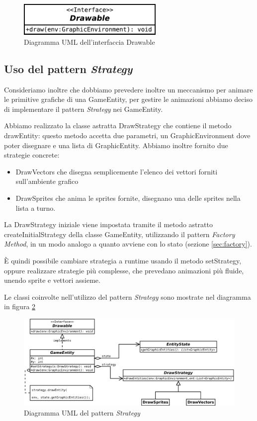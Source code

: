 \documentclass[a4paper,12pt]{article}
\begin{document}
\begin{figure}[ht]
\centering
\includegraphics[width=7cm]{Drawable.pdf}
\caption{Diagramma UML dell'interfaccia \textsf{Drawable}}
\label{img:Drawable}
\end{figure}

\subsection{Uso del pattern \emph{Strategy}}

Consideriamo inoltre che dobbiamo prevedere inoltre un meccanismo per animare le primitive grafiche di una \textsf{GameEntity}, per gestire le animazioni abbiamo deciso di implementare il pattern \emph{Strategy} nei \textsf{GameEntity}.

Abbiamo realizzato la classe astratta \textsf{DrawStrategy} che contiene il metodo \textsf{drawEntity}: questo metodo accetta due parametri, un \textsf{GraphicEnvironment} dove poter disegnare e una lista di \textsf{GraphicEntity}. Abbiamo inoltre fornito due strategie concrete:

\begin{itemize}
\item \textsf{DrawVectors} che disegna semplicemente l'elenco dei vettori forniti sull'ambiente grafico
\item \textsf{DrawSprites} che anima le sprites fornite, disegnano una delle sprites nella lista a turno.
\end{itemize}

La \textsf{DrawStrategy} iniziale viene impostata tramite il metodo astratto \textsf{createInitialStrategy} della classe \textsf{GameEntity}, utilizzando il pattern \emph{Factory Method}, in un modo analogo a quanto avviene con lo stato (sezione \ref{sec:factory}).

\`E quindi possibile cambiare strategia a runtime usando il metodo \textsf{setStrategy}, oppure realizzare strategie pi\`u complesse, che prevedano animazioni pi\`u fluide, unendo sprite e vettori assieme.

Le classi coinvolte nell'utilizzo del pattern \emph{Strategy} sono mostrate nel diagramma in figura \ref{img:Strategy}

\begin{figure}[h]
\centering
\includegraphics[width=14cm]{Strategy.pdf}
\caption{Diagramma UML del pattern \emph{Strategy}}
\label{img:Strategy}
\end{figure}
\end{document}
